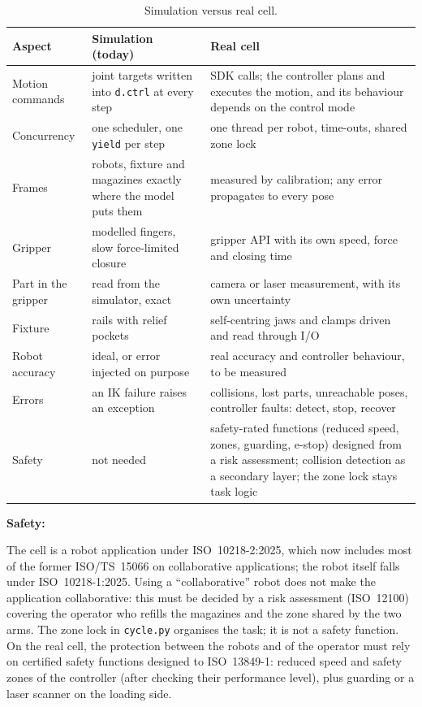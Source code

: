 \documentclass[11pt,a4paper]{article}
\newcommand{\code}[1]{\texttt{#1}}
\begin{document}
\begin{table}[H]
\centering
\caption{Simulation versus real cell.}
\label{tab:sim2real}
\small
\begin{tabularx}{\textwidth}{@{}p{2.7cm} L L@{}}
\toprule
Aspect & Simulation (today) & Real cell\\
\midrule
Motion commands & joint targets written into \code{d.ctrl} at every step & SDK calls; the
controller plans and executes the motion, and its behaviour depends on the control mode\\
Concurrency & one scheduler, one \code{yield} per step & one thread per robot, time-outs, shared
zone lock\\
Frames & robots, fixture and magazines exactly where the model puts them & measured by
calibration; any error propagates to every pose\\
Gripper & modelled fingers, slow force-limited closure & gripper API with its own speed, force
and closing time\\
Part in the gripper & read from the simulator, exact & camera or laser measurement, with its own
uncertainty\\
Fixture & rails with relief pockets & self-centring jaws and clamps driven and read through I/O\\
Robot accuracy & ideal, or error injected on purpose & real accuracy and controller behaviour, to
be measured\\
Errors & an IK failure raises an exception & collisions, lost parts, unreachable poses, controller
faults: detect, stop, recover\\
Safety & not needed & safety-rated functions (reduced speed, zones, guarding, e-stop) designed
from a risk assessment; collision detection as a secondary layer; the zone lock stays task logic\\
\bottomrule
\end{tabularx}
\end{table}

\textbf{Safety:}

The cell is a robot application under ISO~10218-2:2025, which now includes most of the former
ISO/TS~15066 on collaborative applications; the robot itself falls under ISO~10218-1:2025. Using a
``collaborative'' robot does not make the application collaborative: this must be decided by a risk
assessment (ISO~12100) covering the operator who refills the magazines and the zone shared by the
two arms. The zone lock in \code{cycle.py} organises the task; it is not a safety function. On the
real cell, the protection between the robots and of the operator must rely on certified safety
functions designed to ISO~13849-1: reduced speed and safety zones of the controller (after checking
their performance level), plus guarding or a laser scanner on the loading side.
\end{document}
